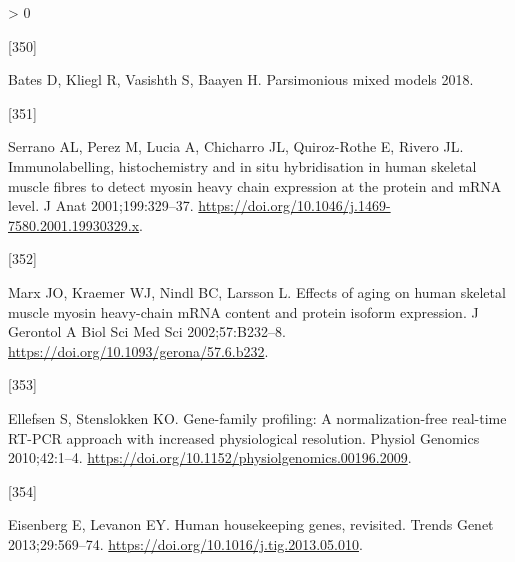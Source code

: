 \documentclass[twoside,10pt]{gihclass} %
\newlength{\cslhangindent}
\newlength{\csllabelwidth}
\newenvironment{CSLReferences}[3] %
 {%
  \setlength{\parindent}{0pt}
  \ifodd #1 \everypar{\setlength{\hangindent}{\cslhangindent}}\ignorespaces\fi
  \ifnum #2 > 0
  \setlength{\parskip}{#2\baselineskip}
  \fi
 }%
 {}
\newcommand{\CSLLeftMargin}[1]{\parbox[t]{\maxof{\widthof{#1}}{\csllabelwidth}}{#1}}
\newcommand{\CSLRightInline}[1]{\parbox[t]{\linewidth}{#1}}
\begin{document}
\begin{CSLReferences}{0}{0}
\leavevmode\hypertarget{ref-bates2018parsimonious}{}%
\CSLLeftMargin{{[}350{]} }
\CSLRightInline{Bates D, Kliegl R, Vasishth S, Baayen H. Parsimonious mixed models 2018.}

\leavevmode\hypertarget{ref-RN2444}{}%
\CSLLeftMargin{{[}351{]} }
\CSLRightInline{Serrano AL, Perez M, Lucia A, Chicharro JL, Quiroz-Rothe E, Rivero JL. Immunolabelling, histochemistry and in situ hybridisation in human skeletal muscle fibres to detect myosin heavy chain expression at the protein and mRNA level. J Anat 2001;199:329--37. \url{https://doi.org/10.1046/j.1469-7580.2001.19930329.x}.}

\leavevmode\hypertarget{ref-RN2445}{}%
\CSLLeftMargin{{[}352{]} }
\CSLRightInline{Marx JO, Kraemer WJ, Nindl BC, Larsson L. Effects of aging on human skeletal muscle myosin heavy-chain mRNA content and protein isoform expression. J Gerontol A Biol Sci Med Sci 2002;57:B232--8. \url{https://doi.org/10.1093/gerona/57.6.b232}.}

\leavevmode\hypertarget{ref-RN825}{}%
\CSLLeftMargin{{[}353{]} }
\CSLRightInline{Ellefsen S, Stenslokken KO. Gene-family profiling: A normalization-free real-time RT-PCR approach with increased physiological resolution. Physiol Genomics 2010;42:1--4. \url{https://doi.org/10.1152/physiolgenomics.00196.2009}.}

\leavevmode\hypertarget{ref-RN1759}{}%
\CSLLeftMargin{{[}354{]} }
\CSLRightInline{Eisenberg E, Levanon EY. Human housekeeping genes, revisited. Trends Genet 2013;29:569--74. \url{https://doi.org/10.1016/j.tig.2013.05.010}.}

\end{CSLReferences}

\end{document}
